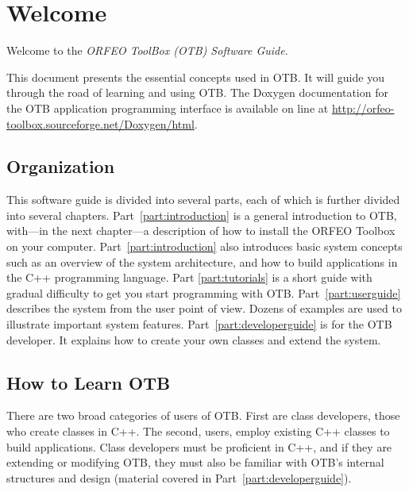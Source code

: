 \chapter{Welcome}
\label{chapter:Welcome}

Welcome to the \emph{ORFEO ToolBox (OTB) Software Guide}.

This document presents the essential concepts used in OTB. It will
guide you through the road of learning and using OTB. The Doxygen
documentation for the OTB application programming interface is
available on line at \url{http://orfeo-toolbox.sourceforge.net/Doxygen/html}.

\section{Organization}
\label{sec:Organization}

This software guide is divided into several parts, each of which is further
divided into several chapters. Part~\ref{part:introduction} is a general
introduction to OTB,
with---in the next chapter---a description of how to install the ORFEO
Toolbox on your computer. Part~\ref{part:introduction} also
introduces basic system concepts such as an overview of the system
architecture, and how to build applications in the C++ programming
language. Part \ref{part:tutorials} is a short guide with gradual difficulty to
get you start programming with OTB. Part~\ref{part:userguide} describes the
system from the user point of view. Dozens
of examples are used to illustrate important system features.
Part~\ref{part:developerguide}  is for
the OTB developer. It explains how to create your own classes and extend
the system.%

\section{How to Learn OTB}
\label{sec:HowToLearnOTB}

There are two broad categories of users of OTB. First are class
developers, those who create classes in C++. The second, users, employ
existing C++ classes to build applications. Class developers must be
proficient in C++, and if they are extending or modifying OTB, they
must also be familiar with OTB's internal structures and design
(material covered in Part~\ref{part:developerguide}).


